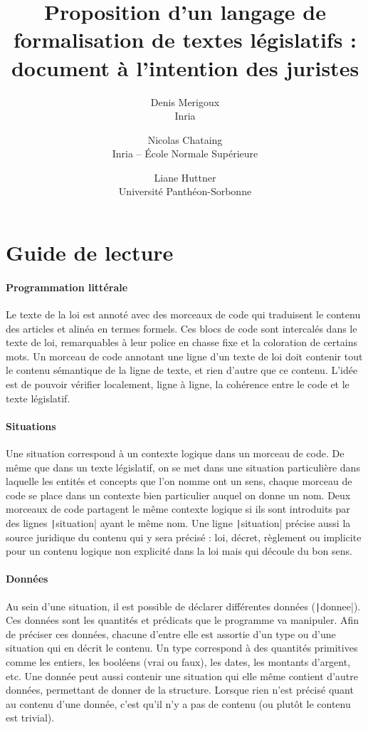 \documentclass[11pt, french]{article}
\title{
  Proposition d'un langage de formalisation de textes législatifs :\\
  document à l'intention des juristes
}
\author{
  Denis Merigoux\\Inria\and
  Nicolas Chataing\\Inria -- École Normale Supérieure\and
  Liane Huttner\\Université Panthéon-Sorbonne
}
\begin{document}
\maketitle

\section{Guide de lecture}

\paragraph{Programmation littérale} Le texte de la loi est annoté avec des morceaux de code qui traduisent le contenu des articles et alinéa en termes formels. Ces blocs de code sont intercalés dans le texte de loi, remarquables à leur police en chasse fixe et la coloration de certains mots. Un morceau de code annotant une ligne d'un texte de loi doit contenir tout le contenu sémantique de la ligne de texte, et rien d'autre que ce contenu. L'idée est de pouvoir vérifier localement, ligne à ligne, la cohérence entre le code et le texte législatif.

\paragraph{Situations} Une situation correspond à un contexte logique dans un morceau de code. De même que dans un texte législatif, on se met dans une situation particulière dans laquelle les entités et concepts que l'on nomme ont un sens, chaque morceau de code se place dans un contexte bien particulier auquel on donne un nom. Deux morceaux de code partagent le même contexte logique si ils sont introduits par des lignes \texttt|situation| ayant le même nom. Une ligne \texttt|situation| précise aussi la source juridique du contenu qui y sera précisé : loi, décret, règlement ou implicite pour un contenu logique non explicité dans la loi mais qui découle du bon sens.

\paragraph{Données} Au sein d'une situation, il est possible de déclarer différentes données (\texttt|donnee|). Ces données sont les quantités et prédicats que le programme va manipuler. Afin de préciser ces données, chacune d'entre elle est assortie d'un type ou d'une situation qui en décrit le contenu. Un type correspond à des quantités primitives comme les entiers, les booléens (vrai ou faux), les dates, les montants d'argent, etc. Une donnée peut aussi contenir une situation qui elle même contient d'autre données, permettant de donner de la structure. Lorsque rien n'est précisé quant au contenu d'une donnée, c'est qu'il n'y a pas de contenu (ou plutôt le contenu est trivial).
\end{document}
